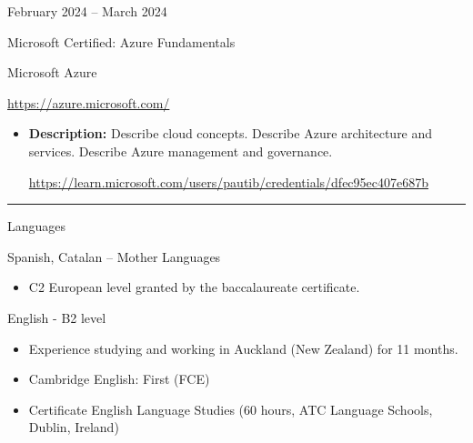 \documentclass[a4paper,10pt]{article}
\newlength{\cvcolumngapwidth}
\newlength{\cvleftcolumnwidth}
\newlength{\cvrightcolumnwidth}
\newcommand{\cvsectionstyle}[1]{{\normalsize\cvsectionfont\textcolor{cvsectioncolor}{#1}}}
\newcommand{\cvtitlestyle}[1]{{\large\cvtitlefont\textcolor{cvtitlecolor}{#1}}}
\newcommand{\cvdurationstyle}[1]{{\small\cvdurationfont\textcolor{cvdurationcolor}{#1}}}
\newcommand{\cvheadingstyle}[1]{{\normalsize\cvheadingfont\textcolor{cvheadingcolor}{#1}}}
\newlength{\cvafteritemskipamount}
\newlength{\cvaftersectionskipamount}
\newlength{\cvbetweensectionandheadingextraskipamount}
\newlength{\cvaftertitleskipamount}
\newlength{\cvparskip}
\newcommand{\cvsection}[1]{
    \begin{minipage}[t]{\cvleftcolumnwidth}
        \raggedleft\cvsectionstyle{#1}
    \end{minipage}%
    \hspace{\cvcolumngapwidth}%
    \begin{minipage}[t]{\cvrightcolumnwidth}
        \textcolor{cvrulecolor}{\rule{\cvrightcolumnwidth}{0.3mm}}
    \end{minipage}

    \vspace{\cvaftersectionskipamount}
}
\newcommand{\cvitem}[2]{
    \begin{minipage}[t]{\cvleftcolumnwidth}
        \raggedleft #1
    \end{minipage}%
    \hspace{\cvcolumngapwidth}%
    \begin{minipage}[t]{\cvrightcolumnwidth}
        \setlength{\parskip}{\cvparskip} #2
    \end{minipage}

    \vspace{\cvafteritemskipamount}
}
\newcommand{\cvtitle}[1]{
    \cvtitlestyle{#1}

    \vspace{\cvaftertitleskipamount}
    \vspace{-\cvparskip}
}
\begin{document}
\cvitem{
 \cvdurationstyle{February 2024 -- March 2024 \hspace{10pt}}
}{
    \cvtitle{Microsoft Certified: Azure Fundamentals}
    
    Microsoft Azure
    \vspace{5pt}
    \begin{center}
        \url{https://azure.microsoft.com/}
    \end{center}
    \begin{itemize}[leftmargin=*]
        \item \textbf{Description:} Describe cloud concepts. Describe Azure architecture and services. Describe Azure management and governance.

        \begin{center}
            \url{https://learn.microsoft.com/users/pautib/credentials/dfec95ec407e687b}
        \end{center}
          
    \end{itemize}
}



\cvsection{SKILLS}

\vspace{\cvbetweensectionandheadingextraskipamount}

\cvitem{
    \cvheadingstyle{Languages}
}{
    Spanish, Catalan -- Mother Languages
    \begin{itemize}
    	\item C2 European level granted by the baccalaureate certificate.
    \end{itemize}
    
    English - B2 level
    \begin{itemize}
     \item Experience studying and working in Auckland (New Zealand) for 11 months.
     \item Cambridge English: First (FCE)
    \item Certificate English Language Studies (60 hours, ATC Language Schools, Dublin, Ireland)

    \end{itemize}
}
\end{document}
